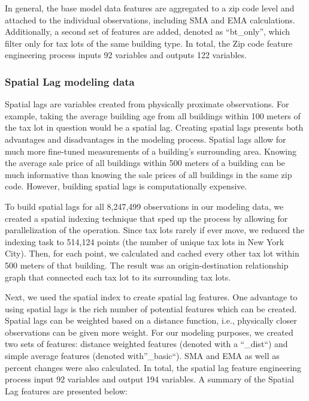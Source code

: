 \documentclass[]{article}
\begin{document}
In general, the base model data features are aggregated to a zip code
level and attached to the individual observations, including SMA and EMA
calculations. Additionally, a second set of features are added, denoted
as ``bt\_only'', which filter only for tax lots of the same building
type. In total, the Zip code feature engineering process inputs 92
variables and outputs 122 variables.

\subsubsection{Spatial Lag modeling
data}\label{spatial-lag-modeling-data}

Spatial lags are variables created from physically proximate
observations. For example, taking the average building age from all
buildings within 100 meters of the tax lot in question would be a
spatial lag. Creating spatial lags presents both advantages and
disadvantages in the modeling process. Spatial lags allow for much more
fine-tuned measurements of a building's surrounding area. Knowing the
average sale price of all buildings within 500 meters of a building can
be much informative than knowing the sale prices of all buildings in the
same zip code. However, building spatial lags is computationally
expensive.

To build spatial lags for all 8,247,499 observations in our modeling
data, we created a spatial indexing technique that sped up the process
by allowing for parallelization of the operation. Since tax lots rarely
if ever move, we reduced the indexing task to 514,124 points (the number
of unique tax lots in New York City). Then, for each point, we
calculated and cached every other tax lot within 500 meters of that
building. The result was an origin-destination relationship graph that
connected each tax lot to its surrounding tax lots.

Next, we used the spatial index to create spatial lag features. One
advantage to using spatial lags is the rich number of potential features
which can be created. Spatial lags can be weighted based on a distance
function, i.e., physically closer observations can be given more weight.
For our modeling purposes, we created two sets of features: distance
weighted features (denoted with a ``\_dist``) and simple average
features (denoted with''\_basic``). SMA and EMA as well as percent
changes were also calculated. In total, the spatial lag feature
engineering process input 92 variables and output 194 variables. A
summary of the Spatial Lag features are presented below:
\end{document}
